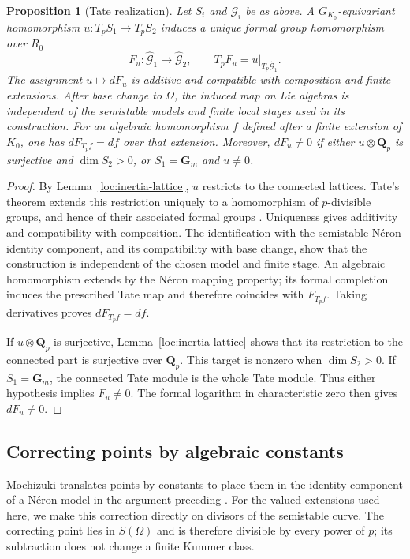 \documentclass[11pt,a4paper]{article}
\numberwithin{equation}{section}
\theoremstyle{plain}
\newtheorem{proposition}[theorem]{Proposition}
\theoremstyle{definition}
\theoremstyle{remark}
\renewcommand{\S}{\ensuremath{\mathsection}}
\begin{document}
\begin{proposition}[Tate realization]
\label{loc:tate-realization}
Let $S_i$ and $\mathcal G_i$ be as above.  A $G_{K_0}$-equivariant
homomorphism $u:T_pS_1\to T_pS_2$ induces a unique formal group
homomorphism over $R_0$
\[
 F_u:\widehat{\mathcal G}_1\longrightarrow\widehat{\mathcal G}_2,
 \qquad T_pF_u=u|_{T_p\widehat{\mathcal G}_1}.
\]
The assignment $u\mapsto dF_u$ is additive and compatible with
composition and finite extensions.  After base change to $\Omega$, the
induced map on Lie algebras is independent of the semistable models and
finite local stages used in its construction.  For an algebraic
homomorphism $f$ defined after a finite extension of $K_0$, one has
$dF_{T_pf}=df$ over that extension.  Moreover, $dF_u\ne0$ if either
$u\otimes\mathbf Q_p$ is surjective and $\dim S_2>0$, or
$S_1=\mathbf G_m$ and $u\ne0$.
\end{proposition}
\begin{proof}
By Lemma~\ref{loc:inertia-lattice}, $u$ restricts to the connected
lattices.  Tate's theorem extends this restriction uniquely to a
homomorphism of $p$-divisible groups, and hence of their associated
formal groups \cite[\S4.2, Theorem~4 and Corollary~1; \S2.2,
Proposition~1]{Tate1967}.  Uniqueness gives additivity and compatibility
with composition.  The identification with the semistable N\'eron
identity component, and its compatibility with base change, show that
the construction is independent of the chosen model and finite stage.
An algebraic homomorphism extends by the N\'eron mapping property; its
formal completion induces the prescribed Tate map and therefore
coincides with $F_{T_pf}$.  Taking derivatives proves
$dF_{T_pf}=df$.

If $u\otimes\mathbf Q_p$ is surjective, Lemma~\ref{loc:inertia-lattice}
shows that its restriction to the connected part is surjective over
$\mathbf Q_p$.  This target is nonzero when $\dim S_2>0$.  If
$S_1=\mathbf G_m$, the connected Tate module is the whole Tate module.
Thus either hypothesis implies $F_u\ne0$.  The formal logarithm in
characteristic zero then gives $dF_u\ne0$.
\end{proof}

\subsection{Correcting points by algebraic constants}

Mochizuki translates points by constants to place them in the identity
component of a N\'eron model in the argument preceding
\cite[Lemma~9.2]{Mochizuki1999}.  For the valued extensions used here,
we make this correction directly on divisors of the semistable curve.
The correcting point lies in $S(\Omega)$ and is therefore divisible by
every power of $p$; its subtraction does not change a finite Kummer class.
\end{document}
